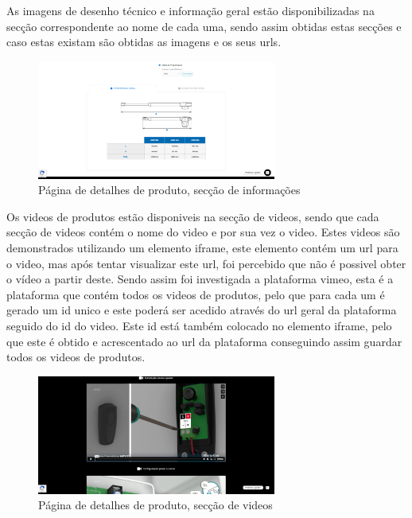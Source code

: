 \newpage

As imagens de desenho técnico e informação geral estão disponibilizadas na secção correspondente
ao nome de cada uma, sendo assim obtidas estas secções e caso estas existam são obtidas as imagens e os seus urls.

\begin{figure}[htb]
    \centering
    
    \includegraphics[width=0.7\textwidth]{images/implementacao/scraper/pagina_detalhes_desenhos.png}
    \caption{Página de detalhes de produto, secção de informações}
    \label{fig:54}
\end{figure}

Os videos de produtos estão disponiveis na secção de videos, sendo que cada secção de videos contém o nome do video e por sua vez o video.
Estes videos são demonstrados utilizando um elemento iframe, este elemento contém um url para o video, mas após tentar visualizar este url,
foi percebido que não é possivel obter o vídeo a partir deste. Sendo assim foi investigada a plataforma vimeo, esta é a plataforma que contém
todos os videos de produtos, pelo que para cada um é gerado um id unico e este poderá ser acedido através do url geral da plataforma seguido 
do id do video. Este id está também colocado no elemento iframe, pelo que este é obtido e acrescentado ao url da plataforma conseguindo assim
guardar todos os videos de produtos.

\begin{figure}[htb]
    \centering
    
    \includegraphics[width=0.7\textwidth]{images/implementacao/scraper/pagina_detalhes_videos.png}
    \caption{Página de detalhes de produto, secção de videos}
    \label{fig:55}
\end{figure}

